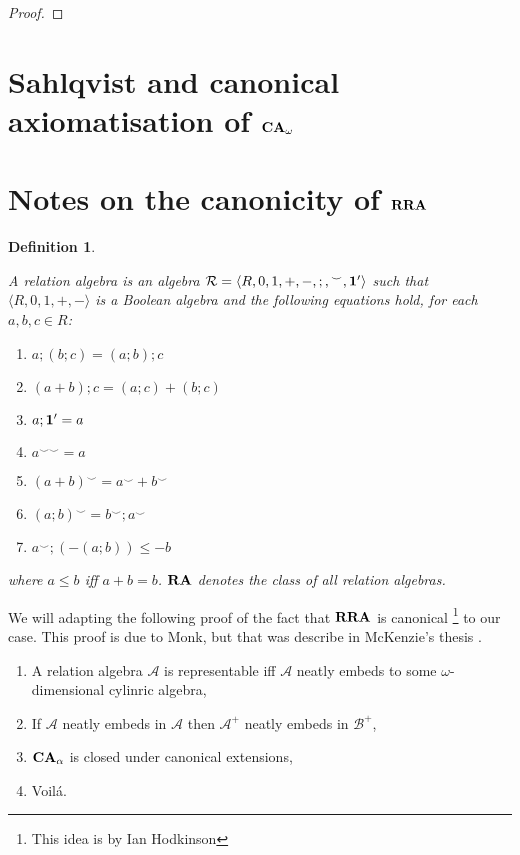 \documentclass[a4paper]{article}
\theoremstyle{defin}
\newtheorem{defin}{Definition}
\theoremstyle{theorem}
\theoremstyle{prop}
\theoremstyle{lemma}
\theoremstyle{fact}
\theoremstyle{ex}
\theoremstyle{col}
\begin{document}
\begin{proof}

\end{proof}

\section{Sahlqvist and canonical axiomatisation of ${\bf CA}_{\omega}$}

\section{Notes on the canonicity of ${\bf RRA}$}

\begin{defin}
  $ $

    A relation algebra is an algebra $\mathcal{R} = \langle R, 0, 1, +, -, ;, {}^{\smile}, {\bf 1 }' \rangle$ such that $\langle R, 0, 1, +, - \rangle$ is a Boolean algebra and the following
    equations hold, for each $a, b, c \in R$:
    \begin{enumerate}
      \item $a ; (b ; c) = (a ; b) ; c$
      \item $(a + b) ; c = (a ; c) + (b ; c)$
      \item $a ; {\bf 1}' = a$
      \item $a^{\smile \smile} = a$
      \item $(a + b)^{\smile} = a^{\smile} + b^{\smile}$
      \item $(a ; b)^{\smile} = b^{\smile} ; a^{\smile}$
      \item $a^{\smile} ; (- (a ; b)) \leq - b$
    \end{enumerate}
    where $a \leq b$ iff $a + b = b$. ${\bf RA}$ denotes the class of all relation
    algebras.
\end{defin}

We will adapting the following proof of the fact that ${\bf RRA}$ is canonical \footnote{This idea is by Ian Hodkinson} to our case. This proof is due to Monk, but that was describe in McKenzie's thesis \cite{mckenzie1968representation}.

\begin{enumerate}
  \item A relation algebra $\mathcal{A}$ is representable iff $\mathcal{A}$ neatly embeds to some $\omega$-dimensional cylinric algebra,
  \item If $\mathcal{A}$ neatly embeds in $\mathcal{A}$ then $\mathcal{A}^{+}$ neatly embeds in $\mathcal{B}^{+}$,
  \item ${\bf CA}_{\alpha}$ is closed under canonical extensions,
  \item Voil\'{a}.
\end{enumerate}
\end{document}
